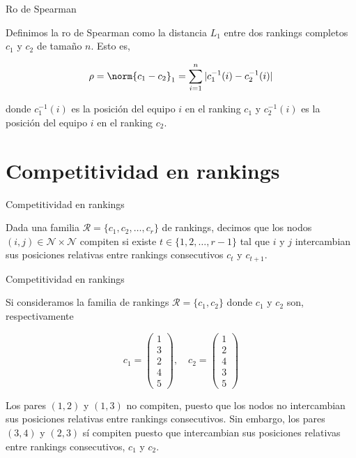 \documentclass[11pt]{beamer}
\begin{document}
	\begin{frame}{Ro de Spearman}
		\begin{defi}
			Definimos la ro de Spearman como la distancia $L_1$ entre dos rankings completos $c_1$ y $c_2$ de tamaño $n$. Esto es, 
			
			\begin{equation}
			\rho = \norm{c_1 - c_2}_1 = \sum\limits_{i=1}^{n} |c_1^{-1}(i) - c_2^{-1}(i)|
			\end{equation}
			
			donde $c_1^{-1}(i)$ es la posición del equipo $i$ en el ranking $c_1$ y $c_2^{-1}(i)$ es la posición del equipo $i$ en el ranking $c_2$.
		\end{defi}
	
	\end{frame}
	
	\section{Competitividad en rankings}
	
	\begin{frame}{Competitividad en rankings}
		\begin{defi}
			Dada una familia $\mathcal{R} = \{c_1, c_2, \dots, c_r\}$ de rankings, decimos que los nodos $(i,j) \in \mathcal{N} \times \mathcal{N}$ compiten si existe $t \in \{1,2,\dots, r-1\}$ tal que $i$ y $j$ intercambian sus posiciones relativas entre rankings consecutivos $c_t$ y $c_{t+1}$.
		\end{defi}
	\end{frame}
	
	\begin{frame}{Competitividad en rankings}
		\begin{ejemplo}
			Si consideramos la familia de rankings $\mathcal{R} = \{c_1, c_2\}$ donde $c_1$ y $c_2$ son, respectivamente
			
			\begin{equation*}
			c_1 = \left( \begin{array}{c}
			1\\
			3\\
			2\\
			4\\
			5
			\end{array} \right), \quad
			c_2 = \left( \begin{array}{c}
			1\\
			2\\
			4\\
			3\\
			5
			\end{array} \right)
			\end{equation*}
			
			Los pares $(1,2)$ y $(1,3)$ no compiten, puesto que los nodos no intercambian sus posiciones relativas entre rankings consecutivos. Sin embargo, los pares $(3,4)$ y $(2,3)$ sí compiten puesto que intercambian sus posiciones relativas entre rankings consecutivos, $c_1$ y $c_2$.
		\end{ejemplo}
	\end{frame}
	
\end{document}
